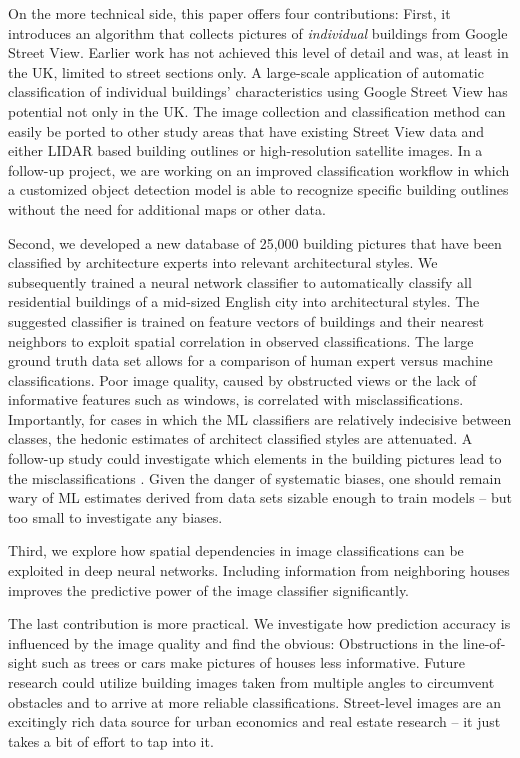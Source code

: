 \documentclass[]{article}
\begin{document}
On the more technical side, this paper offers four contributions: First, it introduces an algorithm that collects pictures of \emph{individual} buildings from
Google Street View. Earlier work has not achieved this level of detail
and was, at least in the UK, limited to street sections only. A
large-scale application of automatic classification of individual
buildings' characteristics using Google Street View has potential not
only in the UK. The image collection and classification method can
easily be ported to other study areas that have existing Street View
data and either LIDAR based building outlines or high-resolution satellite images. In a follow-up project, we are working on an improved
classification workflow in which a customized object detection model is
able to recognize specific building outlines without the need for
additional maps or other data.

Second, we developed a new database of 25,000 building pictures that
have been classified by architecture experts into relevant architectural
styles. We subsequently trained a neural network classifier to
automatically classify all residential buildings of a mid-sized English
city into architectural styles. The suggested classifier is trained on
feature vectors of buildings and their nearest neighbors to exploit
spatial correlation in observed classifications. The large ground truth data set allows for a comparison of human expert versus machine classifications. Poor image quality, caused by
obstructed views or the lack of informative features such as windows, is
correlated with misclassifications. Importantly, for cases in which the
ML classifiers are relatively indecisive between classes, the hedonic estimates of architect classified styles are attenuated. A follow-up study could
investigate which elements in the building pictures lead to the
misclassifications \autocite{Ribeiro2016}. Given the danger of
systematic biases, one should remain wary of ML estimates derived from
data sets sizable enough to train models -- but too small to investigate
any biases.

Third, we explore how spatial dependencies in image classifications can be exploited in deep neural networks. Including information from neighboring houses improves the predictive power of the image classifier significantly.

The last contribution is more practical. We investigate how prediction accuracy is influenced by the image quality and find the obvious: Obstructions in the line-of-sight such as trees or cars make pictures of houses less informative. Future research could utilize building images taken from multiple angles to circumvent obstacles and to arrive at more reliable classifications. Street-level images are an excitingly rich data source for urban economics and real estate research -- it just takes a bit of effort to tap into it.
\end{document}
